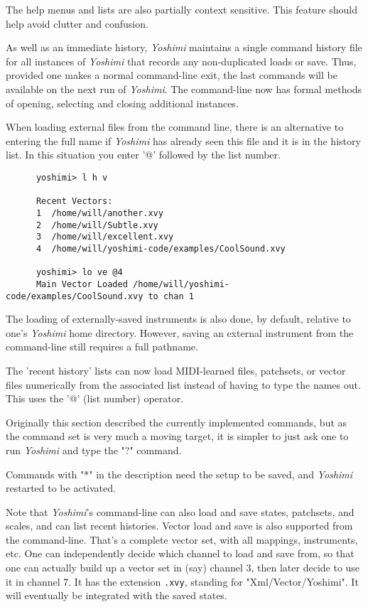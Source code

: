    The help menus and lists are also partially context sensitive. This
   feature should help avoid clutter and confusion.

   As well as an immediate history, \textsl{Yoshimi} maintains a single command
   history file for all instances of \textsl{Yoshimi} that records any
   non-duplicated loads or save.  Thus, provided one makes a normal
   command-line exit, the last commands will be available on the next run of
   \textsl{Yoshimi}.
   The command-line now has formal methods of opening, selecting and closing
   additional instances.

   When loading external files from the command line, there is an alternative
   to entering the full name if \textsl{Yoshimi} has already seen this file and
   it is in the history list. In this situation you enter '@' followed by the
   list number.

   \begin{verbatim}
      yoshimi> l h v

      Recent Vectors:
      1  /home/will/another.xvy
      2  /home/will/Subtle.xvy
      3  /home/will/excellent.xvy
      4  /home/will/yoshimi-code/examples/CoolSound.xvy

      yoshimi> lo ve @4
      Main Vector Loaded /home/will/yoshimi-code/examples/CoolSound.xvy to chan 1
   \end{verbatim}

   The loading of externally-saved instruments is also done, by default,
   relative to one's \textsl{Yoshimi} home directory.  However, saving an
   external instrument from the command-line still requires a full pathname.

   The 'recent history' lists can now load MIDI-learned files, patchsets, or
   vector files numerically from the associated list instead of having to type
   the names out.  This uses the '@' (list number) operator.

   Originally this section described the currently implemented commands,
   but as the command set is very much a moving target, it is simpler to just
   ask one to run \textsl{Yoshimi} and type the "?" command.

   Commands with "*" in the description need the setup to be saved,
   and \textsl{Yoshimi} restarted to be activated.

   Note that \textsl{Yoshimi}'s command-line can also load and save states,
   patchsets, and scales, and can list recent histories.
   Vector load and save is also supported from the command-line.
   That's a complete vector set, with all mappings, instruments, etc.
   One can independently decide which
   channel to load and save from, so that one
   can actually build up a vector set in
   (say) channel 3, then later decide to use it in channel 7.
   It has the extension \texttt{.xvy}, standing for "Xml/Vector/Yoshimi".
   It will eventually be integrated with the saved states.


